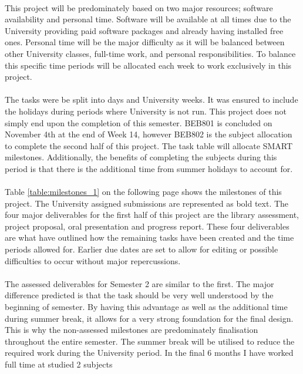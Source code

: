 \paragraph{}
This project will be predominately based on two major resources; software availability and personal time. Software will be available at all times due to the University providing paid software packages and already having installed free ones. Personal time will be the major difficulty as it will be balanced between other University classes, full-time work, and personal responsibilities. To balance this specific time periods will be allocated each week to work exclusively in this project.    

\paragraph{}
The tasks were be split into days and University weeks. It was ensured to include the holidays during periods where University is not run. This project does not simply end upon the completion of this semester. BEB801 is concluded on November 4th at the end of Week 14, however BEB802 is the subject allocation to complete the second half of this project. The task table will allocate SMART milestones. Additionally, the benefits of completing the subjects during this period is that there is the additional time from summer holidays to account for.

\paragraph{}
Table \ref{table:milestones_1} on the following page shows the milestones of this project. The University assigned submissions are represented as bold text. The four major deliverables for the first half of this project are the library assessment, project proposal, oral presentation and progress report. These four deliverables are what have outlined how the remaining tasks have been created and the time periods allowed for. Earlier due dates are set to allow for editing or possible difficulties to occur without major repercussions. 

\paragraph{}
The assessed deliverables for Semester 2 are similar to the first. The major difference predicted is that the task should be very well understood by the beginning of semester. By having this advantage as well as the additional time during summer break, it allows for a very strong foundation for the final design. This is why the non-assessed milestones are predominately finalisation throughout the entire semester. The summer break will be utilised to reduce the required work during the University period. In the final 6 months I have worked full time at studied 2 subjects 

